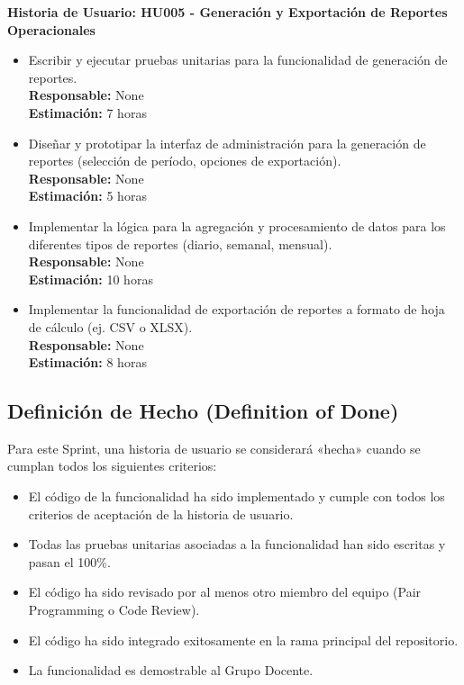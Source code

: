 \documentclass[12pt]{article}
\begin{document}
\textbf{Historia de Usuario: HU005 - Generación y Exportación de Reportes Operacionales}
\begin{itemize}
	\item Escribir y ejecutar pruebas unitarias para la funcionalidad de generación de reportes. \\
	\textbf{Responsable:} None \\
	\textbf{Estimación:} 7 horas
	\item Diseñar y prototipar la interfaz de administración para la generación de reportes (selección de período, opciones de exportación). \\
	\textbf{Responsable:} None \\
	\textbf{Estimación:} 5 horas
	\item Implementar la lógica para la agregación y procesamiento de datos para los diferentes tipos de reportes (diario, semanal, mensual). \\
	\textbf{Responsable:} None \\
	\textbf{Estimación:} 10 horas
	\item Implementar la funcionalidad de exportación de reportes a formato de hoja de cálculo (ej. CSV o XLSX). \\
	\textbf{Responsable:} None \\
	\textbf{Estimación:} 8 horas
\end{itemize}


\pagebreak
\pagebreak

\subsection{Definición de Hecho (Definition of Done)}

Para este Sprint, una historia de usuario se considerará «hecha» cuando se cumplan todos los siguientes criterios:

\begin{itemize}
	\item El código de la funcionalidad ha sido implementado y cumple con todos los criterios de aceptación de la historia de usuario.
	\item Todas las pruebas unitarias asociadas a la funcionalidad han sido escritas y pasan el 100\%.
	\item El código ha sido revisado por al menos otro miembro del equipo (Pair Programming o Code Review).
	\item El código ha sido integrado exitosamente en la rama principal del repositorio.
	\item La funcionalidad es demostrable al Grupo Docente.
\end{itemize}
\end{document}
